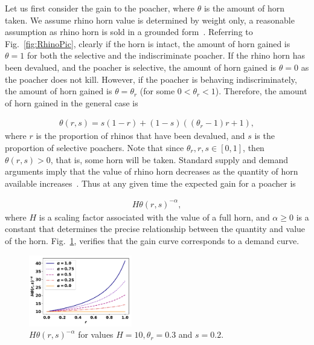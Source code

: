 \documentclass[10pt]{article}
\begin{document}
Let us first consider the gain to the poacher, where \(\theta\) is the amount of 
horn taken. We assume rhino horn value is determined by weight only, a 
reasonable assumption as rhino horn is sold in a grounded form~\cite{Saverhino}.
Referring to Fig.~\ref{fig:RhinoPic}, clearly if the horn is intact, the amount of
horn gained is \(\theta=1\) for both the selective and the indiscriminate poacher.
If the rhino horn has been devalued, and the poacher is selective, the amount of horn 
gained is \(\theta=0\) as the poacher does not kill. However, if the poacher is 
behaving indiscriminately, the amount of horn gained is \(\theta = \theta_r\)
(for some \(0<\theta_r<1\)). 
Therefore, the amount of horn gained in the general case is

\begin{eqnarray}
    \label{eqn:theta}
    \theta(r, s) = s (1 - r) + (1 - s) ((\theta_r - 1) r + 1),
\end{eqnarray}
where \(r\) is the proportion of rhinos that have been devalued, and \(s\) is the 
proportion of selective poachers. Note that since \(\theta_r, r, s  \in [0, 1]\), then
\(\theta(r, s) > 0\), that is, some horn will be taken. Standard supply and demand
arguments imply that the value
of rhino horn decreases as the quantity of horn available increases~\cite{mankiw2010}.
Thus at any given time the expected gain for a poacher is

\begin{eqnarray}
    \label{eqn:individual_gain}
    H \theta(r,s)^{-\alpha},
\end{eqnarray}
where \(H\) is a scaling factor associated with the value of a full horn, and 
\(\alpha \geq 0\) is a constant that determines the precise relationship between
the quantity and value of the horn.  Fig.~\ref{fig:GainCurve}, verifies that the 
gain curve corresponds to a demand curve.

\begin{figure}[!htbp]
\centering
\includegraphics[width=0.4\textwidth]{images/gain_curve.pdf}
\caption{\label{fig:GainCurve} \(H \theta(r, s) ^{- \alpha}\) for values 
\(H = 10, \theta_r = 0.3\) and \(s = 0.2.\)}
\end{figure}
\end{document}
